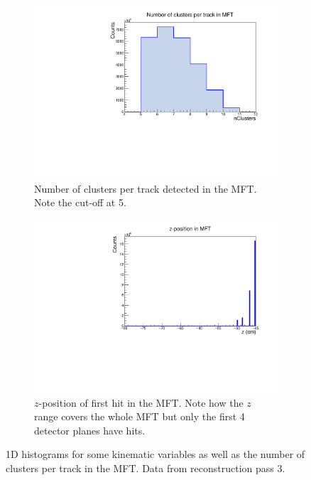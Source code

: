 \begin{figure}[h]
\begin{subfigure}[t]{.49\linewidth}
        \centering
        \includegraphics[width=\linewidth]{Plots/pass3_MFT/nClusters_pass3.pdf}
        \caption{Number of clusters per track detected in the MFT. Note the cut-off at 5.}
        \label{fig:MFTnClusters_pass3}
    \end{subfigure}
    \hfill
    \begin{subfigure}[t]{.49\linewidth}
        \centering
        \includegraphics[width=\linewidth]{Plots/pass3_MFT/Z_MFT_pass3.pdf}
        \caption{$z$-position of first hit in the MFT. Note how the $z$ range covers the whole MFT but only the first 4 detector planes have hits.}
        \label{fig:Z_MFT_pass3}
    \end{subfigure}
\caption{1D histograms for some kinematic variables as well as the number of clusters per track in the MFT. Data from reconstruction pass 3. }
\label{fig:MFT_1D_pass3}
\end{figure}

